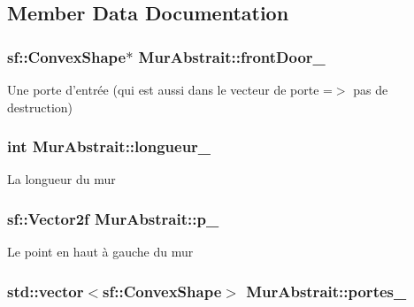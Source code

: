 \subsection{Member Data Documentation}
\hypertarget{classMurAbstrait_acbeeab18ec5268cc2b961ec207a267b5}{
\subsubsection[{front\-Door\-\_\-}]{\setlength{\rightskip}{0pt plus 5cm}sf\-::\-Convex\-Shape$\ast$ Mur\-Abstrait\-::front\-Door\-\_\-\hspace{0.3cm}{\ttfamily [protected]}}}\label{classMurAbstrait_acbeeab18ec5268cc2b961ec207a267b5}
Une porte d'entrée (qui est aussi dans le vecteur de porte =$>$ pas de destruction) \hypertarget{classMurAbstrait_ac7e49466459ab38ee25538917aefd7a2}{
\subsubsection[{longueur\-\_\-}]{\setlength{\rightskip}{0pt plus 5cm}int Mur\-Abstrait\-::longueur\-\_\-\hspace{0.3cm}{\ttfamily [protected]}}}\label{classMurAbstrait_ac7e49466459ab38ee25538917aefd7a2}
La longueur du mur \hypertarget{classMurAbstrait_a620d216e13a772d931294d64caf1554f}{
\subsubsection[{p\-\_\-}]{\setlength{\rightskip}{0pt plus 5cm}sf\-::\-Vector2f Mur\-Abstrait\-::p\-\_\-\hspace{0.3cm}{\ttfamily [protected]}}}\label{classMurAbstrait_a620d216e13a772d931294d64caf1554f}
Le point en haut à gauche du mur \hypertarget{classMurAbstrait_a23ab70f739321ac626be2c59b83cf670}{
\subsubsection[{portes\-\_\-}]{\setlength{\rightskip}{0pt plus 5cm}std\-::vector$<$sf\-::\-Convex\-Shape$>$ Mur\-Abstrait\-::portes\-\_\-\hspace{0.3cm}{\ttfamily [protected]}}}\label{classMurAbstrait_a23ab70f739321ac626be2c59b83cf670}
